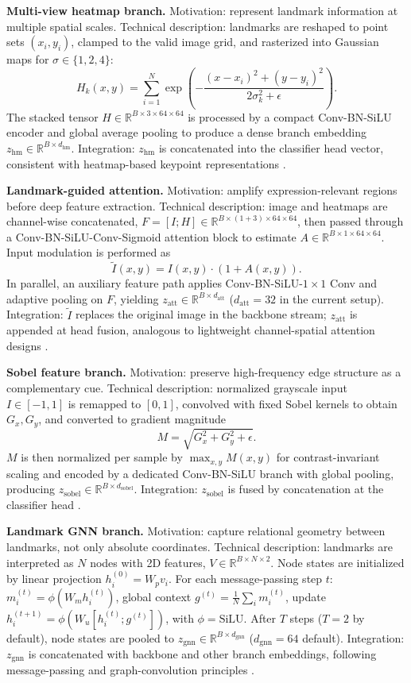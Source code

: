 \textbf{Multi-view heatmap branch.}
Motivation: represent landmark information at multiple spatial scales.
Technical description: landmarks are reshaped to point sets \((x_i,y_i)\), clamped to the valid image grid, and rasterized into Gaussian maps for \(\sigma\in\{1,2,4\}\):
\[
H_k(x,y)=\sum_{i=1}^{N}\exp\left(-\frac{(x-x_i)^2+(y-y_i)^2}{2\sigma_k^2+\epsilon}\right).
\]
The stacked tensor \(H\in\mathbb{R}^{B\times 3\times 64\times 64}\) is processed by a compact Conv-BN-SiLU encoder and global average pooling to produce a dense branch embedding \(z_{\text{hm}}\in\mathbb{R}^{B\times d_{\text{hm}}}\).
Integration: \(z_{\text{hm}}\) is concatenated into the classifier head vector, consistent with heatmap-based keypoint representations \cite{newell2016stacked}.

\textbf{Landmark-guided attention.}
Motivation: amplify expression-relevant regions before deep feature extraction.
Technical description: image and heatmaps are channel-wise concatenated, \(F=[I;H]\in\mathbb{R}^{B\times (1+3)\times 64\times 64}\), then passed through a Conv-BN-SiLU-Conv-Sigmoid attention block to estimate \(A\in\mathbb{R}^{B\times 1\times 64\times 64}\).
Input modulation is performed as
\[
\tilde{I}(x,y)=I(x,y)\cdot(1+A(x,y)).
\]
In parallel, an auxiliary feature path applies Conv-BN-SiLU-\(1\times1\) Conv and adaptive pooling on \(F\), yielding \(z_{\text{att}}\in\mathbb{R}^{B\times d_{\text{att}}}\) (\(d_{\text{att}}=32\) in the current setup).
Integration: \(\tilde{I}\) replaces the original image in the backbone stream; \(z_{\text{att}}\) is appended at head fusion, analogous to lightweight channel-spatial attention designs \cite{woo2018cbam}.

\textbf{Sobel feature branch.}
Motivation: preserve high-frequency edge structure as a complementary cue.
Technical description: normalized grayscale input \(I\in[-1,1]\) is remapped to \([0,1]\), convolved with fixed Sobel kernels to obtain \(G_x,G_y\), and converted to gradient magnitude
\[
M=\sqrt{G_x^2+G_y^2+\epsilon}.
\]
\(M\) is then normalized per sample by \(\max_{x,y} M(x,y)\) for contrast-invariant scaling and encoded by a dedicated Conv-BN-SiLU branch with global pooling, producing \(z_{\text{sobel}}\in\mathbb{R}^{B\times d_{\text{sobel}}}\).
Integration: \(z_{\text{sobel}}\) is fused by concatenation at the classifier head \cite{sobel1968isotropic}.

\textbf{Landmark GNN branch.}
Motivation: capture relational geometry between landmarks, not only absolute coordinates.
Technical description: landmarks are interpreted as \(N\) nodes with 2D features, \(V\in\mathbb{R}^{B\times N\times 2}\). Node states are initialized by linear projection \(h_i^{(0)}=W_p v_i\).
For each message-passing step \(t\): \(m_i^{(t)}=\phi(W_m h_i^{(t)})\), global context \(g^{(t)}=\frac{1}{N}\sum_i m_i^{(t)}\), update \(h_i^{(t+1)}=\phi\!\left(W_u[h_i^{(t)};g^{(t)}]\right)\), with \(\phi=\mathrm{SiLU}\).
After \(T\) steps (\(T=2\) by default), node states are pooled to \(z_{\text{gnn}}\in\mathbb{R}^{B\times d_{\text{gnn}}}\) (\(d_{\text{gnn}}=64\) default).
Integration: \(z_{\text{gnn}}\) is concatenated with backbone and other branch embeddings, following message-passing and graph-convolution principles \cite{gilmer2017neural,kipf2017semi}.


